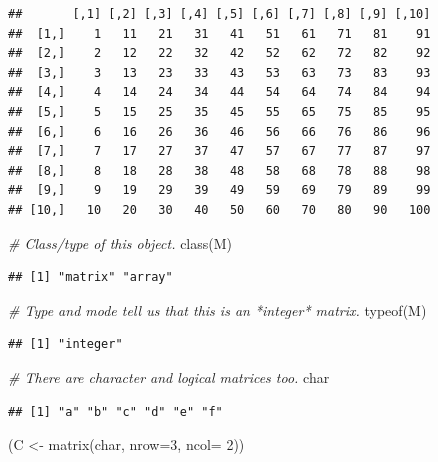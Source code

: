 \documentclass[
]{book}
\newenvironment{Shaded}{\begin{snugshade}}{\end{snugshade}}
\newcommand{\AttributeTok}[1]{\textcolor[rgb]{0.77,0.63,0.00}{#1}}
\newcommand{\CommentTok}[1]{\textcolor[rgb]{0.56,0.35,0.01}{\textit{#1}}}
\newcommand{\DecValTok}[1]{\textcolor[rgb]{0.00,0.00,0.81}{#1}}
\newcommand{\FunctionTok}[1]{\textcolor[rgb]{0.00,0.00,0.00}{#1}}
\newcommand{\NormalTok}[1]{#1}
\newcommand{\OtherTok}[1]{\textcolor[rgb]{0.56,0.35,0.01}{#1}}
\begin{document}
\begin{verbatim}
##       [,1] [,2] [,3] [,4] [,5] [,6] [,7] [,8] [,9] [,10]
##  [1,]    1   11   21   31   41   51   61   71   81    91
##  [2,]    2   12   22   32   42   52   62   72   82    92
##  [3,]    3   13   23   33   43   53   63   73   83    93
##  [4,]    4   14   24   34   44   54   64   74   84    94
##  [5,]    5   15   25   35   45   55   65   75   85    95
##  [6,]    6   16   26   36   46   56   66   76   86    96
##  [7,]    7   17   27   37   47   57   67   77   87    97
##  [8,]    8   18   28   38   48   58   68   78   88    98
##  [9,]    9   19   29   39   49   59   69   79   89    99
## [10,]   10   20   30   40   50   60   70   80   90   100
\end{verbatim}

\begin{Shaded}
\begin{Highlighting}[]
\CommentTok{\# Class/type of this object.}
\FunctionTok{class}\NormalTok{(M)}
\end{Highlighting}
\end{Shaded}

\begin{verbatim}
## [1] "matrix" "array"
\end{verbatim}

\begin{Shaded}
\begin{Highlighting}[]
\CommentTok{\# Type and mode tell us that this is an *integer* matrix.}
\FunctionTok{typeof}\NormalTok{(M)}
\end{Highlighting}
\end{Shaded}

\begin{verbatim}
## [1] "integer"
\end{verbatim}

\begin{Shaded}
\begin{Highlighting}[]
\CommentTok{\# There are character and logical matrices too.}
\NormalTok{char}
\end{Highlighting}
\end{Shaded}

\begin{verbatim}
## [1] "a" "b" "c" "d" "e" "f"
\end{verbatim}

\begin{Shaded}
\begin{Highlighting}[]
\NormalTok{(C }\OtherTok{\textless{}{-}} \FunctionTok{matrix}\NormalTok{(char, }\AttributeTok{nrow=}\DecValTok{3}\NormalTok{, }\AttributeTok{ncol=} \DecValTok{2}\NormalTok{))}
\end{Highlighting}
\end{Shaded}
\end{document}
